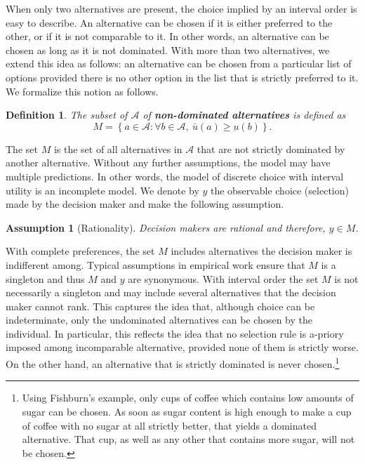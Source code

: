 \documentclass[reqno]{article}
\newtheorem{definition}{Definition}
\newtheorem{Assumption}{Assumption}
\begin{document}
When only two alternatives are present, the choice implied by an interval
order is easy to describe. An alternative can be chosen if it is either
preferred to the other, or if it is not comparable to it. In other words, an
alternative can be chosen as long as it is not dominated. With more than two
alternatives, we extend this idea as follows: an alternative can be chosen
from a particular list of options provided there is no other option in the
list that is strictly preferred to it. We formalize this notion as follows.

\begin{definition}
The subset of $\mathcal{A}$ of \textbf{non-dominated alternatives} is defined as $$
M=\left\{ a\in \mathcal{A} :\forall b\in \mathcal{A},\ \bar{u}(a)\geq \underbar{u}(b)\right\}. $$
\end{definition}

The set $M$ is the set of all alternatives in $\mathcal{A}$ that
are not strictly dominated by another alternative. Without any further assumptions, the model may have multiple predictions. In other words, the model of discrete choice with interval utility is an incomplete model. We denote by $y$ the observable choice (selection) made by the decision maker and make the following assumption.

\begin{Assumption}[Rationality] \label{rationality}
Decision makers are rational and therefore, $y\in M$.
\end{Assumption}

With complete preferences, the set $M$ includes alternatives the
decision maker is indifferent among. Typical assumptions in empirical work ensure that $M$ is a singleton and thus $M$ and $y$ are synonymous. With interval order the set $M$ is not necessarily a singleton and may include several alternatives that the decision maker
cannot rank. This captures the idea that, although choice can be indeterminate, only the undominated alternatives can be chosen by the individual. In particular, this reflects the idea that no selection rule is a-priory imposed among incomparable alternative, provided none of them is strictly worse. On the other hand, an alternative that is strictly dominated is never chosen.\footnote{Using Fishburn's example, only cups of coffee which contains low amounts of sugar can be chosen. As soon as sugar content is high enough to make a cup of coffee with no sugar at all strictly better, that yields a dominated alternative. That cup, as well as any other that contains more sugar, will not be chosen.}
\end{document}
